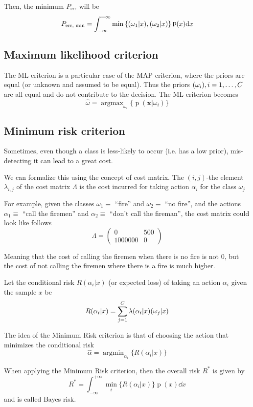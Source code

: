 \documentclass[oneside,onecolumn]{report}
\DeclareMathOperator*{\argmax}{argmax}
\DeclareMathOperator*{\argmin}{argmin}
\DeclareMathOperator*{\pdf}{p}
\let\P\relax
\DeclareMathOperator*{\P}{P}
\begin{document}
Then, the minimum $P_\text{err}$ will be
$$ P_\text{err, min} = \int_{-\infty}^{+\infty} \min\left\{ \P(\omega_1 | x), \P(\omega_2 | x) \right\} \pdf(x) \dd x $$


\subsection{Maximum likelihood criterion}
The ML criterion is a particular case of the MAP criterion, where the priors are equal (or unknown and assumed to be equal).
Thus the priors $\P(\omega_i), i = 1, \dots, C$ are all equal and do not contribute to the decision.
The ML criterion becomes
$$ \widehat \omega = \argmax_{\omega_i} \{ \pdf(\bm x | \omega_i) \} $$

\subsection{Minimum risk criterion}
Sometimes, even though a class is less-likely to occur (i.e. has a low prior), mis-detecting it can lead to a great cost.

We can formalize this using the concept of cost matrix.
The $(i,j)$-the element $\lambda_{i,j}$ of the cost matrix $\Lambda$ is the cost incurred for taking action $\alpha_i$ for the class $\omega_j$

For example, given the classes $\omega_1 \equiv$ ``fire'' and $\omega_2 \equiv$ ``no fire'', and the actions $\alpha_1 \equiv$ ``call the firemen'' and $\alpha_2 \equiv$ ``don't call the fireman'', the cost matrix could look like follows
$$ \Lambda = \begin{pmatrix}
    0 & 500 \\
    1000000 & 0
\end{pmatrix} $$

Meaning that the cost of calling the firemen when there is no fire is not 0, but the cost of not calling the firemen where there is a fire is much higher.

Let the conditional risk $R(\alpha_i | x)$ (or expected loss) of taking an action $\alpha_i$ given the sample $x$ be
$$ R(\alpha_i | x) = \sum_{j = 1}^C \lambda(\alpha_i | x) \P(\omega_j | x) $$

The idea of the Minimum Risk criterion is that of choosing the action that minimizes the conditional risk
$$ \widehat{\alpha} = \argmin_{\alpha_i} \{ R(\alpha_i | x) \} $$

When applying the Minimum Risk criterion, then the overall risk $R^*$ is given by
$$ R^* = \int_{-\infty}^{+\infty} \min_i\{R(\alpha_i | x)\} \pdf(x) \dd x $$
and is called Bayes risk.
\end{document}
